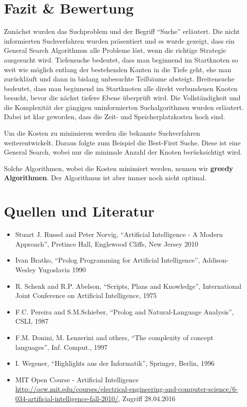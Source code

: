 \section{Fazit \& Bewertung}
Zunächst wurden das Suchproblem und der Begriff \enquote{Suche} erläutert. Die nicht informierten Suchverfahren wurden präsentiert und es wurde gezeigt, dass ein General Search Algorithmus alle Probleme löst, wenn die richtige Strategie ausgesucht wird.
Tiefensuche bedeutet, dass man beginnend im Startknoten so weit wie möglich entlang der bestehenden Kanten in die Tiefe geht, ehe man zurückläuft und dann in bislang unbesuchte Teilbäume absteigt.
Breitensuche bedeutet, dass man beginnend im Startknoten alle direkt verbundenen Knoten besucht, bevor die nächst tiefere Ebene überprüft wird.
Die Vollständigkeit und die Komplexität der gängigen uninformierten Suchalgorithmen wurden erläutert.
Dabei ist klar geworden, dass die Zeit- und Speicherplatzkosten hoch sind.

Um die Kosten zu minimieren werden die bekannte Suchverfahren weiterentwickelt. Daraus folgte zum Beispiel die Best-First Suche. Diese ist eine General Search, wobei nur die minimale Anzahl der Knoten berücksichtigt wird.

Solche Algorithmen, wobei die Kosten minimiert werden, nennen wir \textbf{greedy Algorithmen}. Der Algorithmus ist aber immer noch nicht optimal.

\section{Quellen und Literatur}

\begin{itemize}
\item Stuart J. Russel and Peter Norvig, “Artificial Intelligence - A Modern Approach”, Pretince Hall, Englewood Cliffs, New Jersey 2010
\item Ivan Bratko, “Prolog Programming for Artificial Intelligence”, Addison-Wesley Yugoslavia 1990
\item R. Schenk and R.P. Abelson, “Scripts, Plans and Knowledge”, International Joint Conference on Artificial Intelligence, 1975
\item F.C. Pereira and S.M.Schieber, “Prolog and Natural-Language Analysis”, CSLI, 1987
\item F.M. Donini, M. Lenzerini and others, “The complexity of concept languages”, Inf. Comput., 1997
\item I. Wegener, “Highlights aus der Informatik”, Springer, Berlin, 1996
\item MIT Open Course - Artificial Intelligence
 \url{http://ocw.mit.edu/courses/electrical-engineering-and-computer-science/6-034-artificial-intelligence-fall-2010/}, Zugriff 28.04.2016
\end{itemize}
